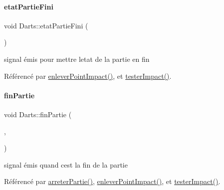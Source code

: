 \mbox{\label{class_darts_a04a60e25e4c6a608a15c6abce35c9dfa}} 
\paragraph{\texorpdfstring{etat\+Partie\+Fini}{etatPartieFini}}
{\footnotesize\ttfamily void Darts\+::etat\+Partie\+Fini (\begin{DoxyParamCaption}{ }\end{DoxyParamCaption})\hspace{0.3cm}{\ttfamily [signal]}}



signal émis pour mettre l\textquotesingle{}etat de la partie en fin 



Référencé par \hyperlink{darts_8cpp_source_l00274}{enlever\+Point\+Impact()}, et \hyperlink{darts_8cpp_source_l00246}{tester\+Impact()}.

\mbox{\label{class_darts_a751870924fe01a94fbf49ce45451a218}} 
\paragraph{\texorpdfstring{fin\+Partie}{finPartie}}
{\footnotesize\ttfamily void Darts\+::fin\+Partie (\begin{DoxyParamCaption}\item[{Q\+String}]{,  }\item[{int}]{ }\end{DoxyParamCaption})\hspace{0.3cm}{\ttfamily [signal]}}



signal émis quand c\textquotesingle{}est la fin de la partie 



Référencé par \hyperlink{darts_8cpp_source_l00422}{arreter\+Partie()}, \hyperlink{darts_8cpp_source_l00274}{enlever\+Point\+Impact()}, et \hyperlink{darts_8cpp_source_l00246}{tester\+Impact()}.

\mbox{\label{class_darts_a76db114bd2191b410bab26cfe5cb76fb}} 
